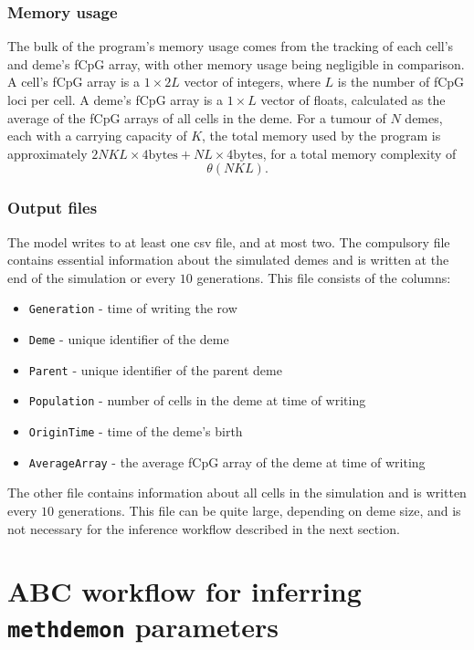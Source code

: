 \subsubsection{Memory usage}
The bulk of the program's memory usage comes from the tracking of each cell's
and deme's fCpG array, with other memory usage being negligible in comparison.
A cell's fCpG array is a $1\times 2L$ vector of integers, where $L$ is the
number of fCpG loci per cell. A deme's fCpG array is a $1\times L$ vector of
floats, calculated as the average of the fCpG arrays of all cells in the deme.
For a tumour of $N$ demes, each with a carrying capacity of $K$, the total
memory used by the program is approximately
$2NKL\times4\text{bytes}+NL\times4\text{bytes}$, for a total memory complexity
of
\begin{equation}
    \theta(NKL).
\end{equation}

\subsubsection{Output files}
The model writes to at least one csv file, and at most two. The compulsory file
contains essential information about the simulated demes and is written at the
end of the simulation or every $10$ generations. This file consists of the
columns:
\begin{itemize}
    \item \texttt{Generation} - time of writing the row
    \item \texttt{Deme} - unique identifier of the deme
    \item \texttt{Parent} - unique identifier of the parent deme
    \item \texttt{Population} - number of cells in the deme at time of writing
    \item \texttt{OriginTime} - time of the deme's birth
    \item \texttt{AverageArray} - the average fCpG array of the deme at time of
        writing
\end{itemize}
The other file contains information about all cells in the simulation and is
written every $10$ generations. This file can be quite large, depending on deme
size, and is not necessary for the inference workflow described in the next
section.

\section{ABC workflow for inferring \texttt{methdemon} parameters}\label{section:methabc}

